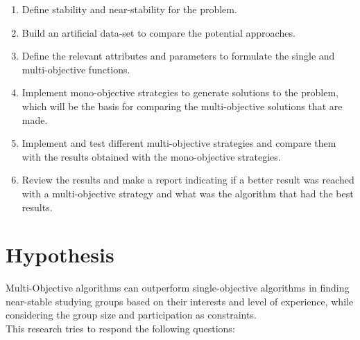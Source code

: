 \begin{enumerate}
    
    \item Define stability and near-stability for the problem.

    \item Build an artificial data-set to compare the potential approaches.

    \item Define the relevant attributes and parameters to formulate the single and multi-objective functions.

    \item Implement mono-objective strategies to generate solutions to the problem, which will be the basis for comparing the multi-objective solutions that are made.

    \item Implement and test different multi-objective strategies and compare them with the results obtained with the mono-objective strategies.

    \item Review the results and make a report indicating if a better result was reached with a multi-objective strategy and what was the algorithm that had the best results.
\end{enumerate}

\section{Hypothesis}

Multi-Objective algorithms can outperform single-objective algorithms in finding near-stable studying groups based on their interests and level of experience, while considering the group size and participation as constraints.\\

This research tries to respond the following questions:

